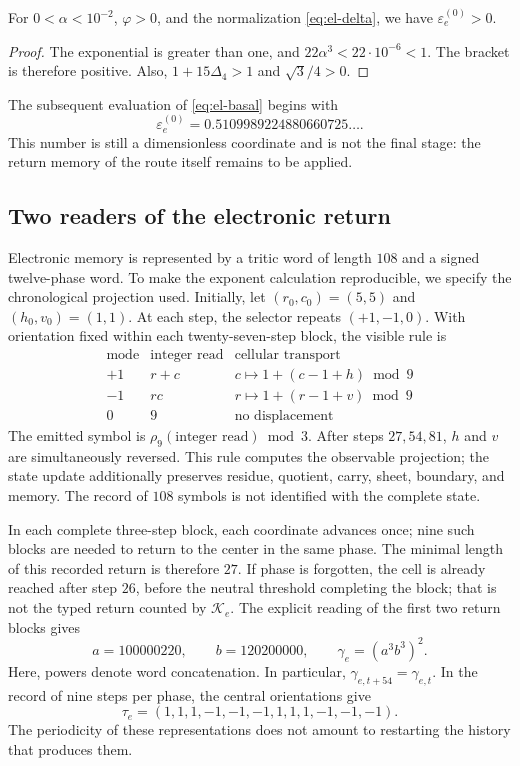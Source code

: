 \begin{proposition}
For \(0<\alpha<10^{-2}\), \(\varphi>0\), and the normalization
\eqref{eq:el-delta}, we have \(\varepsilon_e^{(0)}>0\).
\end{proposition}
\begin{proof}
The exponential is greater than one, and
\(22\alpha^3<22\cdot10^{-6}<1\). The bracket is therefore positive.
Also, \(1+15\Delta_4>1\) and \(\sqrt3/4>0\).
\end{proof}

The subsequent evaluation of \eqref{eq:el-basal} begins with
\[
 \varepsilon_e^{(0)}=0.5109989224880660725\ldots.
\]
This number is still a dimensionless coordinate and is not the
final stage: the return memory of the route itself remains to be applied.

\subsection{Two readers of the electronic return}

Electronic memory is represented by a tritic word of length
\(108\) and a signed twelve-phase word. To make the exponent
calculation reproducible, we specify the chronological projection
used. Initially, let
\((r_0,c_0)=(5,5)\) and \((h_0,v_0)=(1,1)\). At each step, the selector
repeats \((+1,-1,0)\). With orientation fixed within each
twenty-seven-step block, the visible rule is
\[
 \begin{array}{c|c|c}
 \text{mode}&\text{integer read}&\text{cellular transport}\\\hline
 +1&r+c&c\mapsto1+(c-1+h)\bmod9\\
 -1&rc&r\mapsto1+(r-1+v)\bmod9\\
 0&9&\text{no displacement}
 \end{array}
\]
The emitted symbol is \(\rho_9(\text{integer read})\bmod3\).
After steps \(27,54,81\), \(h\) and \(v\) are simultaneously
reversed. This rule computes the observable projection; the
state update additionally preserves residue, quotient,
carry, sheet, boundary, and memory. The record of
\(108\) symbols is not identified with the complete state.

In each complete three-step block, each coordinate advances
once; nine such blocks are needed to return to the center in
the same phase. The minimal length of this recorded return is
therefore \(27\). If phase is forgotten, the cell is already reached after
step \(26\), before the neutral threshold completing the block; that is not
the typed return counted by \(\mathcal K_e\). The explicit reading
of the first two return blocks gives
\begin{equation}
 a=100000220,\qquad b=120200000,\qquad
 \gamma_e=(a^3b^3)^2.
 \label{eq:el-palabra}
\end{equation}
Here, powers denote word concatenation. In particular,
\(\gamma_{e,t+54}=\gamma_{e,t}\). In the record of nine steps per
phase, the central orientations give
\begin{equation}
 \tau_e=(1,1,1,-1,-1,-1,1,1,1,-1,-1,-1).
 \label{eq:el-tau}
\end{equation}
The periodicity of these representations does not amount to restarting the
history that produces them.

